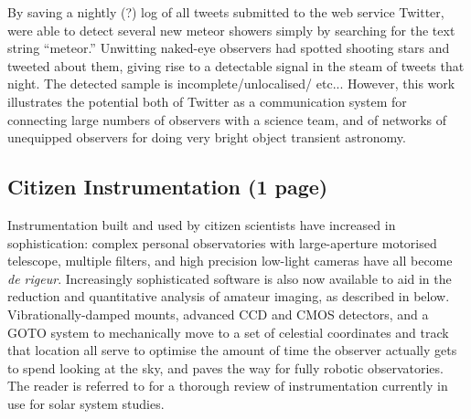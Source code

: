 \documentclass{ar2e}
\begin{document}

By saving a nightly (?) log of all tweets submitted to the web service
Twitter, \citet{Barentsen++2010} were able to 
detect several new meteor showers simply by searching for the text string
``meteor.'' Unwitting naked-eye observers had spotted shooting stars and
tweeted about them, giving rise to a detectable signal in the steam of tweets
that night. The detected sample is incomplete/unlocalised/ etc... However,
this work illustrates the potential both of Twitter as a communication system
for connecting large numbers of observers with a science team, and of networks
of unequipped observers for doing very bright object transient astronomy.





\subsection{Citizen Instrumentation (1 page)}
\label{sec:instr}

Instrumentation built and used by citizen scientists have increased in
sophistication: complex personal observatories with large-aperture motorised
telescope, multiple filters, and high precision low-light cameras have all
become {\it de rigeur}.  Increasingly sophisticated software is also now
available to aid in the reduction and quantitative analysis of amateur imaging,
as described in \Sref{} below.  Vibrationally-damped mounts, advanced CCD and
CMOS detectors, and a GOTO system to mechanically move to a set of celestial
coordinates and track that location all serve to optimise the amount of time the
observer actually gets to spend looking at the sky, and paves the way for fully
robotic observatories.  The reader is referred to \citet{13mousis} for a
thorough review of instrumentation currently in use for solar system studies.


\end{document}
